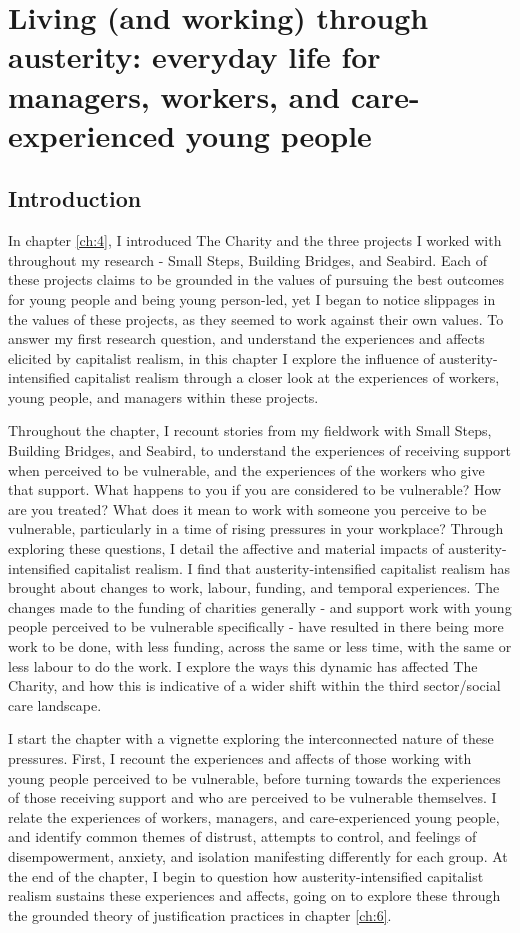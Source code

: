\chapter{Living (and working) through austerity: everyday life for managers, workers, and care-experienced young people}
\label{ch:5}

\section{Introduction}
\label{sec:5-intro}

In chapter \ref{ch:4}, I introduced The Charity and the three projects I worked with throughout my research - Small Steps, Building Bridges, and Seabird. Each of these projects claims to be grounded in the values of pursuing the best outcomes for young people and being young person-led, yet I began to notice slippages in the values of these projects, as they seemed to  work against their own values. To answer my first research question, and understand the experiences and affects elicited by capitalist realism, in this chapter I explore the influence of austerity-intensified capitalist realism through a closer look at the experiences of workers, young people, and managers within these projects.

Throughout the chapter, I recount stories from my fieldwork with Small Steps, Building Bridges, and Seabird, to understand the experiences of receiving support when perceived to be vulnerable, and the experiences of the workers who give that support. What happens to you if you are considered to be vulnerable? How are you treated? What does it mean to work with someone you perceive to be vulnerable, particularly in a time of rising pressures in your workplace? Through exploring these questions, I detail the affective and material impacts of austerity-intensified capitalist realism. I find that austerity-intensified capitalist realism has brought about changes to work, labour, funding, and temporal experiences. The changes made to the funding of charities generally - and support work with young people perceived to be vulnerable specifically - have resulted in there being more work to be done, with less funding, across the same or less time, with the same or less labour to do the work. I explore the ways this dynamic has affected The Charity, and how this is indicative of a wider shift within the third sector/social care landscape. 

I start the chapter with a vignette exploring the interconnected nature of these pressures. First, I recount the experiences and affects of those working with young people perceived to be vulnerable, before turning towards the experiences of those receiving support and who are perceived to be vulnerable themselves. I relate the experiences of workers, managers, and care-experienced young people, and identify common themes of distrust, attempts to control, and feelings of disempowerment, anxiety, and isolation manifesting differently for each group. At the end of the chapter, I begin to question how austerity-intensified capitalist realism sustains these experiences and affects, going on to explore these through the grounded theory of justification practices  in chapter \ref{ch:6}. 

